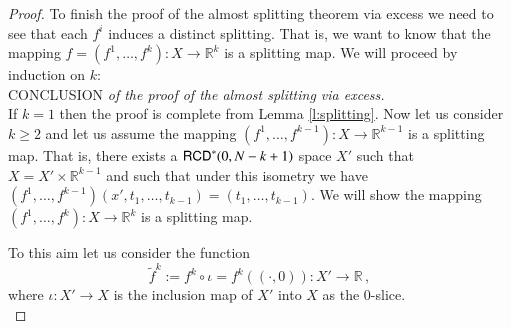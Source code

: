 \documentclass[11pt,reqno]{amsart}
\newcommand{\R}{\mathbb{R}}
\newcommand{\RCD}{{\sf RCD}}
\theoremstyle{definition}
\theoremstyle{remark}
\theoremstyle{remark}
\theoremstyle{remark}
\theoremstyle{remark}
\theoremstyle{remark}
\theoremstyle{remark}
\theoremstyle{remark}
\begin{document}
\begin{proof}
To finish the proof of the almost splitting theorem via excess we need to see that each $f^i$ induces a distinct splitting.  That is, we want to know that the mapping $f=(f^1,\ldots,f^k):X\to \R^k$ is a splitting map.  We will proceed by induction on $k$:\\

CONCLUSION \emph{of the proof of the almost splitting via excess. } 
\\If $k=1$ then the proof is complete from Lemma \ref{l:splitting}.  Now let us consider $k\geq 2$ and let us assume the mapping $(f^1,\ldots,f^{k-1}):X\to \R^{k-1}$ is a splitting map.  That is, there exists a $\RCD^*(0,N-k+1)$ space $X'$ such that $X=X'\times \R^{k-1}$ and such that under this isometry we have  $(f^1,\ldots,f^{k-1})(x',t_1,\ldots,t_{k-1}) = (t_1,\ldots,t_{k-1})$.  We will show the mapping $(f^1,\ldots,f^{k}):X\to \R^{k}$ is a splitting map.

To this aim let us consider the function
$$
\tilde{f}^k:=f^k\circ \iota=f^k((\cdot, 0)): X'\to \R\, ,
$$
where $\iota:X'\to X$ is the inclusion map of $X'$ into $X$ as the $0$-slice.
\\


\end{proof}
\end{document}
